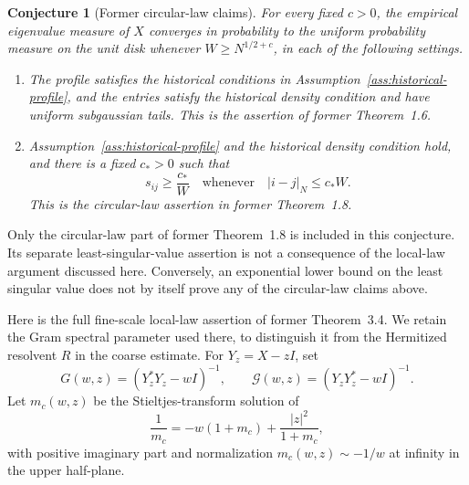 \documentclass[11pt,reqno]{amsart}
\numberwithin{equation}{section}
\theoremstyle{plain}
\newtheorem{conjecture}[theorem]{Conjecture}
\theoremstyle{definition}
\theoremstyle{remark}
\begin{document}
\begin{conjecture}[Former circular-law claims]
\label{conj:historical-circular}
For every fixed \(c>0\), the empirical eigenvalue measure of \(X\)
converges in probability to the uniform probability measure on the unit
disk whenever \(W\geq N^{1/2+c}\), in each of the following settings.
\begin{enumerate}[label=\textup{(\roman*)}]
 \item The profile satisfies the historical conditions in
 Assumption~\ref{ass:historical-profile}, and the entries satisfy the
 historical density condition and have uniform subgaussian tails.
 This is the assertion of former Theorem~1.6.
 \item Assumption~\ref{ass:historical-profile} and the historical density
 condition hold, and there is a fixed \(c_*>0\) such that
 \[
  s_{ij}\geq\frac{c_*}{W}
  \quad\text{whenever}\quad |i-j|_N\leq c_*W.
 \]
 This is the circular-law assertion in former Theorem~1.8.
\end{enumerate}
\end{conjecture}

Only the circular-law part of former Theorem~1.8 is included in this
conjecture.  Its separate least-singular-value assertion is not a
consequence of the local-law argument discussed here.  Conversely, an
exponential lower bound on the least singular value does not by itself
prove any of the circular-law claims above.

Here is the full fine-scale local-law assertion of former Theorem~3.4.
We retain the Gram spectral parameter used there, to distinguish it
from the Hermitized resolvent \(R\) in the coarse estimate.
For \(Y_z=X-zI\), set
\begin{equation}
 G(w,z)=(Y_z^*Y_z-wI)^{-1},\qquad
 \mathcal G(w,z)=(Y_zY_z^*-wI)^{-1}.
 \label{eq:historical-Gram-resolvents}
\end{equation}
Let \(m_c(w,z)\) be the Stieltjes-transform solution of
\begin{equation}
 \frac1{m_c}=-w(1+m_c)+\frac{|z|^2}{1+m_c},
 \label{eq:historical-scalar-equation}
\end{equation}
with positive imaginary part and normalization \(m_c(w,z)\sim-1/w\)
at infinity in the upper half-plane.
\end{document}
